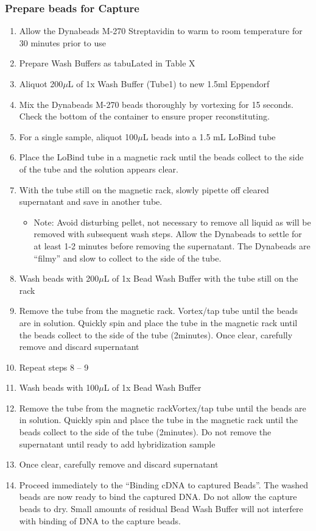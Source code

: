 \subsubsection{Prepare beads for Capture}
\begin{enumerate}
	\item Allow the Dynabeads M-270 Streptavidin to warm to room temperature for 30 minutes prior to use
	\item Prepare Wash Buffers as tabuLated in Table X 
	\item Aliquot 200$\mu$L of 1x Wash Buffer (Tube1) to new 1.5ml Eppendorf 
	\item Mix the Dynabeads M-270 beads thoroughly by vortexing for 15 seconds. Check the bottom of the container to ensure proper reconstituting. 
	\item For a single sample, aliquot 100$\mu$L beads into a 1.5 mL LoBind tube
	\item Place the LoBind tube in a magnetic rack until the beads collect to the side of the tube and the solution appears clear. 
	\item With the tube still on the magnetic rack, slowly pipette off cleared supernatant and save in another tube. 
	\begin{itemize}
		\item Note: Avoid disturbing pellet, not necessary to remove all liquid as will be removed with subsequent wash steps. Allow the Dynabeads to settle for at least 1-2 minutes before removing the supernatant. The Dynabeads are “filmy” and slow to collect to the side of the tube.
	\end{itemize}
	\item Wash beads with 200$\mu$L of 1x Bead Wash Buffer with the tube still on the rack
	\item Remove the tube from the magnetic rack. Vortex/tap tube until the beads are in solution. Quickly spin and place the tube in the magnetic rack until the beads collect to the side of the tube (2minutes). Once clear, carefully remove and discard supernatant
	\item Repeat steps 8 – 9  
	\item Wash beads with 100$\mu$L of 1x Bead Wash Buffer 
	\item Remove the tube from the magnetic rackVortex/tap tube until the beads are in solution. Quickly spin and place the tube in the magnetic rack until the beads collect to the side of the tube (2minutes). 
	Do not remove the supernatant until ready to add hybridization sample 
	\item Once clear, carefully remove and discard supernatant
	\item Proceed immediately to the “Binding cDNA to captured Beads”. The washed beads are now ready to bind the captured DNA. Do not allow the capture beads to dry. Small amounts of residual Bead Wash Buffer will not interfere with binding of DNA to the capture beads.
\end{enumerate} 

